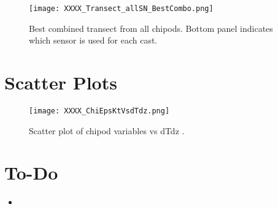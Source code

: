 \documentclass[11pt]{article}
\begin{document}
\begin{figure}[htbp]
\texttt{[image: XXXX\_Transect\_allSN\_BestCombo.png]}
\caption{Best combined transect from all chipods. Bottom panel indicates which sensor is used for each cast.}
\label{}
\end{figure}




\clearpage
\newpage
\section{Scatter Plots}

\begin{figure}[htbp]
\texttt{[image: XXXX\_ChiEpsKtVsdTdz.png]}
\caption{Scatter plot of chipod variables vs dTdz .}
\label{}
\end{figure}



\newpage
\clearpage
\newpage
\section{To-Do}

\begin{itemize}
\item 
\end{itemize}
\end{document}
